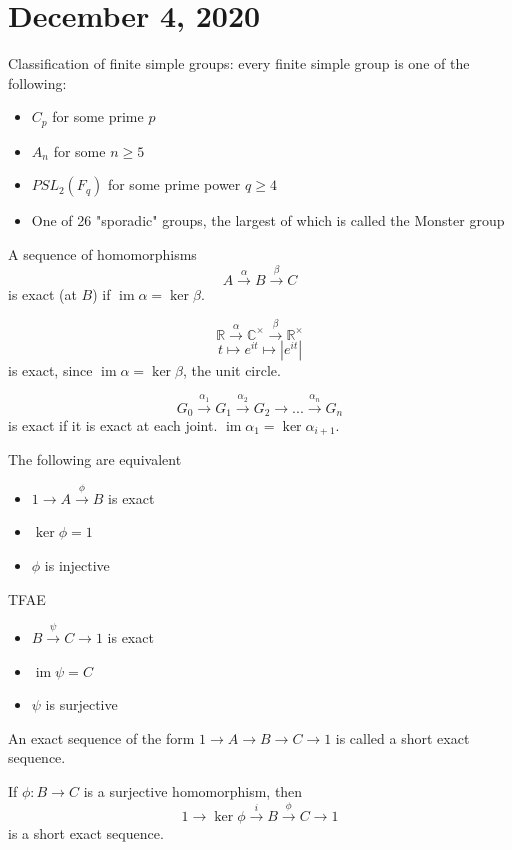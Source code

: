 \documentclass{article}
\newcommand{\C}{\mathbb{C}}
\newcommand{\R}{\mathbb{R}}
\newcommand{\ra}[1][]{\xrightarrow{#1}}
\DeclareMathOperator{\im}{im}
\begin{document}
\section{December 4, 2020}
Classification of finite simple groups: every finite simple group is one of the following:
\begin{itemize}
    \item $C_p$ for some prime $p$
    \item $A_n$ for some $n\geq 5$
    \item $PSL_2(F_q)$ for some prime power $q\geq 4$
    \item One of 26 "sporadic" groups, the largest of which is called the Monster group
\end{itemize}
\begin{definition}
A sequence of homomorphisms
$$A\ra[\alpha]B\ra[\beta]C$$ is exact (at $B$) if $\im\alpha=\ker\beta$.
\end{definition}
\begin{example}
$$\R\ra[\alpha]\C^\times\ra[\beta]\R^\times$$
$$t\mapsto e^{it}\mapsto |e^{it}|$$
is exact, since $\im\alpha=\ker\beta$, the unit circle.
\end{example}
\begin{definition}
$$G_0\ra[\alpha_1]G_1\ra[\alpha_2]G_2\ra...\ra[\alpha_n]G_n$$
is exact if it is exact at each joint. $\im\alpha_1=\ker\alpha_{i+1}$.
\end{definition}
\begin{example}
The following are equivalent
\begin{itemize}
    \item $1\ra A\ra[\phi] B$ is exact
    \item $\ker\phi=1$
    \item $\phi$ is injective
\end{itemize}
\end{example}
\begin{example}
TFAE
\begin{itemize}
    \item $B\ra[\psi]C\ra 1$ is exact
    \item $\im\psi=C$
    \item $\psi$ is surjective
\end{itemize}
\end{example}
\begin{definition}
An exact sequence of the form $1\ra A\ra B\ra C\ra 1$ is called a short exact sequence.
\end{definition}
\begin{example}
If $\phi:B\ra C$ is a surjective homomorphism, then
$$1\ra\ker\phi\ra[i]B\ra[\phi]C\ra 1$$ is a short exact sequence.
\end{example}
\end{document}
